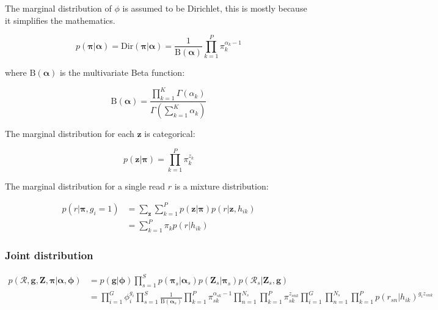\documentclass{article}
\begin{document}
The marginal distribution of $\phi$ is assumed to be Dirichlet, this is mostly because it simplifies the mathematics.

\begin{equation}
\label{eq:cnv_pi_marginal}
    p(\boldsymbol{\pi} | \boldsymbol{\alpha}) = \text{Dir}(\boldsymbol{\pi} | \boldsymbol{\alpha}) = \frac{1}{\text{B}(\boldsymbol{\alpha})} \prod_{k = 1}^P \pi_k^{\alpha_k - 1}
\end{equation}

where $\text{B}(\boldsymbol{\alpha})$ is the multivariate Beta function:

\begin{equation}
\label{eq:beta_func}
    \text{B}(\boldsymbol{\alpha}) = \frac{\prod_{k = 1}^K \Gamma(\alpha_k)}{\Gamma(\sum_{k = 1}^K \alpha_k)}
\end{equation}

The marginal distribution for each $\boldsymbol{z}$ is categorical:

\begin{equation}
\label{eq:cnv_z_marginal}
    p(\boldsymbol{z} | \boldsymbol{\pi}) = \prod_{k = 1}^P \pi_k^{z_k}
\end{equation}

The marginal distribution for a single read $r$ is a mixture distribution:

\begin{align}
\label{eq:cnv_read_marginal}
 p(r | \boldsymbol{\pi}, g_i = 1) &= \sum_{\boldsymbol{z}} \sum^P_{k = 1} p(\boldsymbol{z} | \boldsymbol{\pi}) p(r | \boldsymbol{z}, h_{ik}) \\
 &= \sum^P_{k = 1} \pi_k p(r | h_{ik})
\end{align}

\subsubsection{Joint distribution}

\begin{align}
\label{eq:cnv_jp}
 p(\mathcal{R}, \boldsymbol{g}, \boldsymbol{Z}, \boldsymbol{\pi} | \boldsymbol{\alpha}, \boldsymbol{\phi}) &= p(\boldsymbol{g} | \boldsymbol{\phi}) \prod_{s = 1}^S p(\boldsymbol{\pi}_s | \boldsymbol{\alpha}_s) p(\boldsymbol{Z}_s | \boldsymbol{\pi}_s) p(\mathcal{R}_s | \boldsymbol{Z}_s, \boldsymbol{g}) \\
 &= \prod^G_{i = 1} \phi_i^{g_i} \prod_{s = 1}^S \frac{1}{\text{B}(\boldsymbol{\alpha}_s)} \prod_{k = 1}^P \pi_{sk}^{\alpha_{sk} - 1} \prod_{n = 1}^{N_s} \prod_{k = 1}^P \pi_{sk}^{z_{snk}} \prod^G_{i = 1} \prod_{n = 1}^{N_s} \prod_{k = 1}^P p(r_{sn} | h_{ik})^{g_i z_{snk}}
\end{align}
\end{document}
